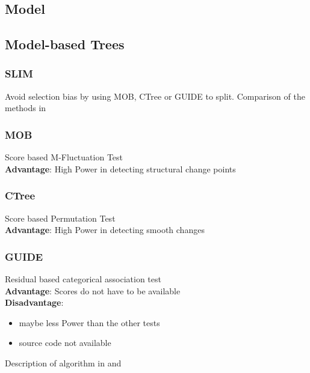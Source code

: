 \subsection{Model}

\subsection{Model-based Trees}
\subsubsection{SLIM}
Avoid selection bias by using MOB, CTree or GUIDE to split.
Comparison of the methods in \citep{Schlosser.24.06.2019}

\subsubsection{MOB}
Score based M-Fluctuation Test \\
\textbf{Advantage}: High Power in detecting structural change points
\subsubsection{CTree}
Score based Permutation Test \\
\textbf{Advantage}: High Power in detecting smooth changes

\subsubsection{GUIDE}
Residual based categorical association test\\
\textbf{Advantage}: Scores do not have to be available\\
\textbf{Disadvantage}: 
\begin{itemize}
    \item maybe less Power than the other tests
    \item source code not available \citep{Loh.2014}
\end{itemize}

Description of algorithm in \citep{Loh.2009} and \citep{.2002}


